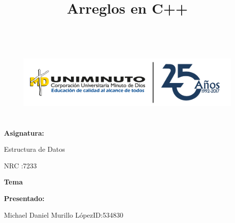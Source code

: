 \documentclass[a4paper,12pt]{article}
\title{Arreglos en C++}
\date{}
\begin{document}
\sloppy



\begin{figure}[H]
\advance\leftskip 0.12in
		\includegraphics[width=5.52in,height=1.58in]{./media/image1.png}
\end{figure}




\noindent 
\vspace{12pt}
\noindent \begin{Center}
{\fontsize{14pt}{14pt}\selectfont \textbf{Asignatura:}}
\end{Center}\par


\noindent \begin{Center}
{\fontsize{14pt}{14pt}\selectfont Estructura de Datos}
\end{Center}\par


\noindent \begin{Center}
{\fontsize{14pt}{14pt}\selectfont NRC :7233}
\end{Center}\par


\noindent \begin{Center}
{\fontsize{14pt}{14pt}\selectfont \textbf{Tema}}
\end{Center}\par

\maketitle
\par


\noindent \begin{Center}
{\fontsize{14pt}{14pt}\selectfont \textbf{Presentado:}}
\end{Center}\par


\noindent \begin{Center}
{\fontsize{14pt}{14pt}\selectfont Michael Daniel Murillo LópezID:534830}
\end{Center}\par
\end{document}
